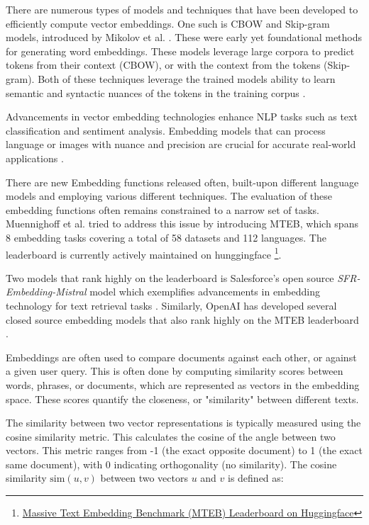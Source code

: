


There are numerous types of models and techniques that have been developed to efficiently compute vector embeddings. One such is \gls{CBOW} and Skip-gram models, introduced by Mikolov et al. \cite{mikolov_efficient_2013}. These were early yet foundational methods for generating word embeddings. These models leverage large corpora to predict tokens from their context (CBOW), or with the context from the tokens (Skip-gram). Both of these techniques leverage the trained models ability to learn semantic and syntactic nuances of the tokens in the training corpus \cite{mikolov_efficient_2013, mikolov_distributed_2013}.


Advancements in vector embedding technologies enhance \gls{NLP} tasks such as text classification and sentiment analysis. Embedding models that can process language or images with nuance and precision are crucial for accurate real-world applications \cite{pennington_glove_2014}.


There are new Embedding functions released often, built-upon different language models and employing various different techniques. The evaluation of these embedding functions often remains constrained to a narrow set of tasks. Muennighoff et al. \cite{muennighoff_mteb_2023} tried to address this issue by introducing \gls{MTEB}, which spans 8 embedding tasks covering a total of 58 datasets and 112 languages. The leaderboard is currently actively maintained on hunggingface \footnote{\href{https://huggingface.co/spaces/mteb/leaderboard}{Massive Text Embedding Benchmark (MTEB) Leaderboard on Huggingface}}.


Two models that rank highly on the leaderboard is Salesforce's open source \textit{SFR-Embedding-Mistral} model which exemplifies advancements in embedding technology for text retrieval tasks \cite{meng_sfr-embedding-mistral_2024}. Similarly, OpenAI has developed several closed source embedding models that also rank highly on the MTEB leaderboard \cite{openai_new_2022, openai_new_2024}.


Embeddings are often used to compare documents against each other, or against a given user query. This is often done by computing similarity scores between words, phrases, or documents, which are represented as vectors in the embedding space. These scores quantify the closeness, or "similarity" between different texts.


The similarity between two vector representations is typically measured using the cosine similarity metric. This calculates the cosine of the angle between two vectors. This metric ranges from -1 (the exact opposite document) to 1 (the exact same document), with 0 indicating orthogonality (no similarity). The cosine similarity \( \text{sim}(u, v) \) between two vectors \( u \) and \( v \) is defined as:


